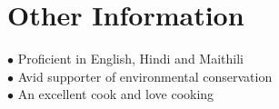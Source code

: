 \documentclass[letterpaper]{twentysecondcv} %
\begin{document}
\begin{twentyshort} %
\end{twentyshort}
\fi

\iffalse
\section{Awards}

\begin{twentyshort} %
	\twentyitemshort{1987}{All-Time Best Fantasy Novel.}
	\twentyitemshort{1998}{All-Time Best Fantasy Novel before 1990.}
\end{twentyshort}
\fi


\section{Other Information}

$\bullet$ Proficient in English, Hindi and Maithili\\
$\bullet$ Avid supporter of environmental conservation\\
$\bullet$ An excellent cook and love cooking\\

\end{document}
